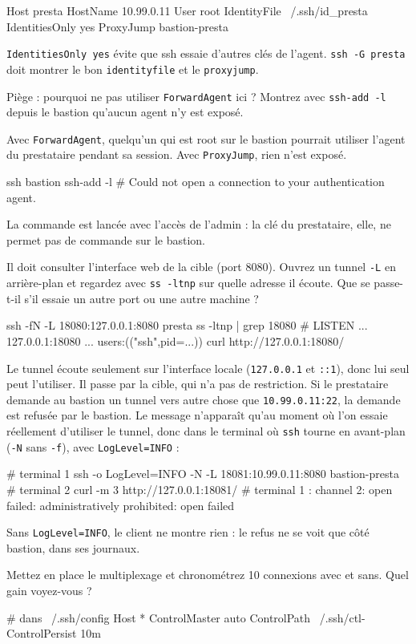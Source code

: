 \documentclass[a4paper,10pt]{exam}
\begin{document}
\begin{questions}
\begin{solution}
\begin{bashcode}
Host presta
    HostName 10.99.0.11
    User root
    IdentityFile ~/.ssh/id_presta
    IdentitiesOnly yes
    ProxyJump bastion-presta
\end{bashcode}
\texttt{IdentitiesOnly yes} évite que ssh essaie d'autres clés de l'agent.
\texttt{ssh -G presta} doit montrer le bon \texttt{identityfile} et le \texttt{proxyjump}.
\end{solution}
\question Piège : pourquoi ne pas utiliser \texttt{ForwardAgent} ici ? Montrez avec
\texttt{ssh-add -l} depuis le bastion qu'aucun agent n'y est exposé.
\begin{solution}
Avec \texttt{ForwardAgent}, quelqu'un qui est root sur le bastion pourrait utiliser
l'agent du prestataire pendant sa session. Avec \texttt{ProxyJump}, rien n'est exposé.
\begin{bashcode}
ssh bastion ssh-add -l
# Could not open a connection to your authentication agent.
\end{bashcode}
La commande est lancée avec l'accès de l'admin : la clé du prestataire, elle, ne permet
pas de commande sur le bastion.
\end{solution}
\question Il doit consulter l'interface web de la cible (port 8080). Ouvrez un tunnel
\texttt{-L} en arrière-plan et regardez avec \texttt{ss -ltnp} sur quelle adresse il
écoute. Que se passe-t-il s'il essaie un autre port ou une autre machine ?
\begin{solution}
\begin{bashcode}
ssh -fN -L 18080:127.0.0.1:8080 presta
ss -ltnp | grep 18080
# LISTEN ... 127.0.0.1:18080 ... users:(("ssh",pid=...))
curl http://127.0.0.1:18080/
\end{bashcode}
Le tunnel écoute seulement sur l'interface locale (\texttt{127.0.0.1} et \texttt{::1}), donc lui seul peut l'utiliser. Il passe
par la cible, qui n'a pas de restriction. Si le prestataire demande au bastion un tunnel
vers autre chose que \texttt{10.99.0.11:22}, la demande est refusée par le bastion. Le
message n'apparaît qu'au moment où l'on essaie réellement d'utiliser le tunnel, donc dans
le terminal où \texttt{ssh} tourne en avant-plan (\texttt{-N} sans \texttt{-f}), avec
\texttt{LogLevel=INFO} :
\begin{bashcode}
# terminal 1
ssh -o LogLevel=INFO -N -L 18081:10.99.0.11:8080 bastion-presta
# terminal 2
curl -m 3 http://127.0.0.1:18081/
# terminal 1 : channel 2: open failed: administratively prohibited: open failed
\end{bashcode}
Sans \texttt{LogLevel=INFO}, le client ne montre rien : le refus ne se voit que côté
bastion, dans ses journaux.
\end{solution}
\question Mettez en place le multiplexage et chronométrez 10 connexions avec et sans.
Quel gain voyez-vous ?
\begin{solution}
\begin{bashcode}
# dans ~/.ssh/config
Host *
    ControlMaster auto
    ControlPath ~/.ssh/ctl-%
    ControlPersist 10m


\end{bashcode}
\end{solution}
\end{questions}
\end{document}
